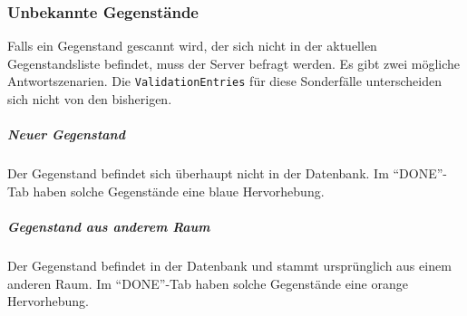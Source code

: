 \hypertarget{unbekannte-gegenstuxe4nde}{%
\subsubsection{Unbekannte Gegenstände}\label{unbekannte-gegenstuxe4nde}}

Falls ein Gegenstand gescannt wird, der sich nicht in der aktuellen
Gegenstandsliste befindet, muss der Server befragt werden. Es gibt zwei
mögliche Antwortszenarien. Die \texttt{ValidationEntries} für diese
Sonderfälle unterscheiden sich nicht von den bisherigen.

\hypertarget{neuer-gegenstand}{%
\subparagraph{Neuer Gegenstand}\label{neuer-gegenstand}}

Der Gegenstand befindet sich überhaupt nicht in der Datenbank. Im
``DONE''-Tab haben solche Gegenstände eine blaue Hervorhebung.

\hypertarget{gegenstand-aus-anderem-raum}{%
\subparagraph{Gegenstand aus anderem
Raum}\label{gegenstand-aus-anderem-raum}}

Der Gegenstand befindet in der Datenbank und stammt ursprünglich aus
einem anderen Raum. Im ``DONE''-Tab haben solche Gegenstände eine orange
Hervorhebung.
